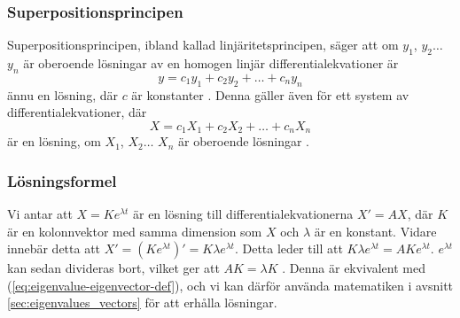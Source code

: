 \subsubsection{Superpositionsprincipen}
Superpositionsprincipen, ibland kallad linjäritetsprincipen, säger att om \(y_1\), \(y_2\hdots\) \(y_n\) är oberoende lösningar av en homogen linjär differentialekvationer är
\begin{equation}
    y=c_1y_1+c_2y_2+\hdots+c_ny_n
\end{equation} ännu en lösning, där \(c\) är konstanter \parencite[130]{zill_differential_2005}. Denna gäller även för ett system av differentialekvationer, där
\begin{equation}
    X=c_1X_1+c_2X_2+\hdots+c_nX_n
\end{equation} är en lösning, om \(X_1\), \(X_2\hdots\) \(X_n\) är oberoende lösningar \parencite[249]{blanchard_differential_2010}.

\subsubsection{Lösningsformel}
Vi antar att \(X=Ke^{\lambda t}\) är en lösning till differentialekvationerna \(X'=AX\), där \(K\) är en kolonnvektor med samma dimension som \(X\) och \(\lambda\) är en konstant. Vidare innebär detta att \(X'=(Ke^{\lambda t})'=K\lambda e^{\lambda t}\). Detta leder till att \(K\lambda e^{\lambda t}=AKe^{\lambda t}\). \(e^{\lambda t}\) kan sedan divideras bort, vilket ger att \(AK=\lambda K\)  \parencite[338]{zill_differential_2005}. Denna är ekvivalent med (\ref{eq:eigenvalue-eigenvector-def}), och vi kan därför använda matematiken i avsnitt \ref{sec:eigenvalues_vectors} för att erhålla lösningar.

